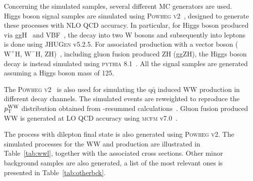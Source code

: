 Concerning the simulated samples, several different MC generators are used. 
Higgs boson signal samples are simulated using \textsc{Powheg v2}~\cite{Nason:2004rx,Frixione:2007vw,Alioli:2010xd}, designed to generate these processes with NLO QCD accuracy.
In particular, for Higgs boson produced via ggH~\cite{Alioli:2008tz} and VBF~\cite{Nason:2009ai},
the decay into two W bosons and subsequently into leptons is done using \textsc{JHUGen} v5.2.5. 
For associated production with a vector boson ($\mathrm{W}^{+}\mathrm{H}$, $\mathrm{W}^{-}\mathrm{H}$, ZH)~\cite{Luisoni:2013kna}, including gluon fusion produced ZH (ggZH), 
the Higgs boson decay is instead simulated using \textsc{pythia} 8.1~\cite{Sjostrand:2007gs}. All the signal samples are generated assuming a Higgs boson mass of 125\GeV.

The \textsc{Powheg v2}~\cite{Melia:2011tj} is also used for simulating the $\mathrm{q\bar q}$ induced WW  production in different decay channels. The simulated events are reweighted to reproduce the $p_\mathrm{T}^\mathrm{WW}$ distribution obtained from \pt-resummed calculations~\cite{Meade:2014fca,Jaiswal:2014yba}. Gluon fusion produced WW is generated at LO QCD accuracy using \textsc{mcfm} v7.0~\cite{Campbell:2013wga}.

The \ttbar process with dilepton final state is also generated using \textsc{Powheg v2}. The simulated processes for the WW and \ttbar production are illustrated in Table~\ref{tab:wwl}, together with the associated cross sections. Other minor background samples are also generated, a list of the most relevant ones is presented in Table~\ref{tab:otherbck}.

